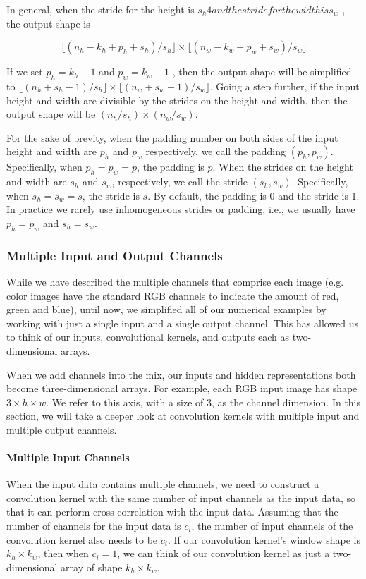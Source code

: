 In general, when the stride for the height is $s_h4  and the stride for the width is s_w$ , the output shape is

$$\lfloor(n_h-k_h+p_h+s_h)/s_h\rfloor \times \lfloor(n_w-k_w+p_w+s_w)/s_w\rfloor$$
 
If we set $p_h=k_h-1$  and  $p_w=k_w-1$ , then the output shape will be simplified to $\lfloor(n_h+s_h-1)/s_h\rfloor \times \lfloor(n_w+s_w-1)/s_w\rfloor$. Going a step further, if the input height and width are divisible by the strides on the height and width, then the output shape will be $(n_h/s_h)\times(n_w/s_w)$.

For the sake of brevity, when the padding number on both sides of the input height and width are $p_h$  and $p_w$  respectively, we call the padding $(p_h,p_w)$. Specifically, when  $p_h=p_w=p$, the padding is $p$. When the strides on the height and width are $s_h$ and $s_w$, respectively, we call the stride $(s_h,s_w)$. Specifically, when $s_h=s_w=s$, the stride is $s$. By default, the padding is 0 and the stride is 1. In practice we rarely use inhomogeneous strides or padding, i.e., we usually have $p_h=p_w$ and $s_h=s_w$.

\subsubsection{Multiple Input and Output Channels}

While we have described the multiple channels that comprise each image (e.g. color images have the standard RGB channels to indicate the amount of red, green and blue), until now, we simplified all of our numerical examples by working with just a single input and a single output channel. This has allowed us to think of our inputs, convolutional kernels, and outputs each as two-dimensional arrays.

When we add channels into the mix, our inputs and hidden representations both become three-dimensional arrays. For example, each RGB input image has shape $3\times h\times w$. We refer to this axis, with a size of 3, as the channel dimension. In this section, we will take a deeper look at convolution kernels with multiple input and multiple output channels.

\paragraph{Multiple Input Channels}

When the input data contains multiple channels, we need to construct a convolution kernel with the same number of input channels as the input data, so that it can perform cross-correlation with the input data. Assuming that the number of channels for the input data is $c_i$, the number of input channels of the convolution kernel also needs to be $c_i$. If our convolution kernel’s window shape is $k_h\times k_w$, then when $c_i=1$, we can think of our convolution kernel as just a two-dimensional array of shape $k_h\times k_w$.

